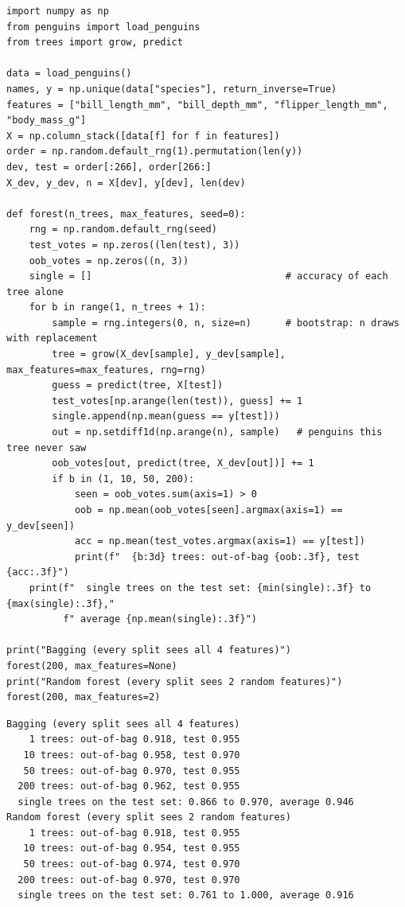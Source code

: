 \begin{verbatim}
import numpy as np
from penguins import load_penguins
from trees import grow, predict

data = load_penguins()
names, y = np.unique(data["species"], return_inverse=True)
features = ["bill_length_mm", "bill_depth_mm", "flipper_length_mm", "body_mass_g"]
X = np.column_stack([data[f] for f in features])
order = np.random.default_rng(1).permutation(len(y))
dev, test = order[:266], order[266:]
X_dev, y_dev, n = X[dev], y[dev], len(dev)

def forest(n_trees, max_features, seed=0):
    rng = np.random.default_rng(seed)
    test_votes = np.zeros((len(test), 3))
    oob_votes = np.zeros((n, 3))
    single = []                                  # accuracy of each tree alone
    for b in range(1, n_trees + 1):
        sample = rng.integers(0, n, size=n)      # bootstrap: n draws with replacement
        tree = grow(X_dev[sample], y_dev[sample], max_features=max_features, rng=rng)
        guess = predict(tree, X[test])
        test_votes[np.arange(len(test)), guess] += 1
        single.append(np.mean(guess == y[test]))
        out = np.setdiff1d(np.arange(n), sample)   # penguins this tree never saw
        oob_votes[out, predict(tree, X_dev[out])] += 1
        if b in (1, 10, 50, 200):
            seen = oob_votes.sum(axis=1) > 0
            oob = np.mean(oob_votes[seen].argmax(axis=1) == y_dev[seen])
            acc = np.mean(test_votes.argmax(axis=1) == y[test])
            print(f"  {b:3d} trees: out-of-bag {oob:.3f}, test {acc:.3f}")
    print(f"  single trees on the test set: {min(single):.3f} to {max(single):.3f},"
          f" average {np.mean(single):.3f}")

print("Bagging (every split sees all 4 features)")
forest(200, max_features=None)
print("Random forest (every split sees 2 random features)")
forest(200, max_features=2)
\end{verbatim}

\begin{verbatim}
Bagging (every split sees all 4 features)
    1 trees: out-of-bag 0.918, test 0.955
   10 trees: out-of-bag 0.958, test 0.970
   50 trees: out-of-bag 0.970, test 0.955
  200 trees: out-of-bag 0.962, test 0.955
  single trees on the test set: 0.866 to 0.970, average 0.946
Random forest (every split sees 2 random features)
    1 trees: out-of-bag 0.918, test 0.955
   10 trees: out-of-bag 0.954, test 0.955
   50 trees: out-of-bag 0.974, test 0.970
  200 trees: out-of-bag 0.970, test 0.970
  single trees on the test set: 0.761 to 1.000, average 0.916
\end{verbatim}

